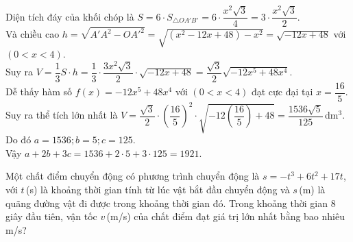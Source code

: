 \begin{ex}
{		Diện tích đáy của khối chóp là $S=6 \cdot S_{\triangle OA'B'}=6 \cdot \dfrac{x^2\sqrt{3}}{4}=3 \cdot \dfrac{x^2\sqrt{3}}{2}$.\\
		Và chiều cao $h=\sqrt{A'A^2-OA'^2}=\sqrt{(x^2-12x+48)-x^2}=\sqrt{-12x+48}$ với $(0<x<4)$.\\
		Suy ra $V=\dfrac{1}{3}S \cdot h = \dfrac{1}{3} \cdot \dfrac{3x^2\sqrt{3}}{2} \cdot \sqrt{-12x+48} = \dfrac{\sqrt{3}}{2}\sqrt{-12x^5+48x^4}$.\\
		Dễ thấy hàm số $f(x)=-12x^5+48x^4$ với $(0<x<4)$ đạt cực đại tại $x=\dfrac{16}{5}$.\\
		Suy ra thể tích lớn nhất là $V=\dfrac{\sqrt{3}}{2} \cdot \left(\dfrac{16}{5}\right)^2 \cdot \sqrt{-12\left(\dfrac{16}{5}\right)+48} = \dfrac{1536\sqrt{5}}{125}$\,dm$^3$.\\
		Do đó $a=1536; b=5; c=125$.\\
		Vậy $a+2b+3c=1536+2 \cdot 5+3 \cdot 125=1921$.
	}
\end{ex}

\begin{ex} %
	Một chất điểm chuyển động có phương trình chuyển động là $s=-t^3+6t^2+17t$, với $t$\,(s) là khoảng thời gian tính từ lúc vật bắt đầu chuyển động và $s$\,(m) là quãng đường vật đi được trong khoảng thời gian đó. Trong khoảng thời gian $8$ giây đầu tiên, vận tốc $v$\,(m/s) của chất điểm đạt giá trị lớn nhất bằng bao nhiêu m/s?
	
	\par{}
\end{ex}
